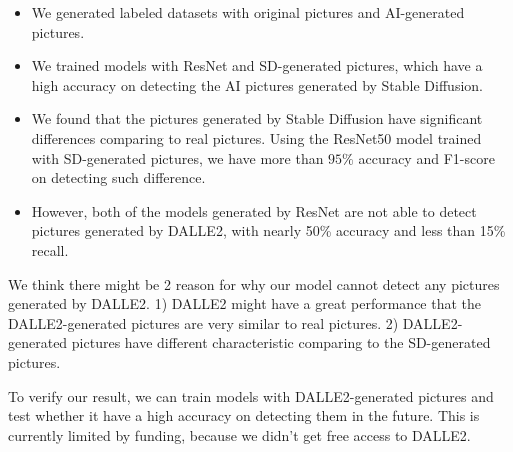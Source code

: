 \documentclass[11pt]{article}
\begin{document}
\begin{itemize}
  \item We generated labeled datasets with original pictures and AI-generated pictures.
  \item We trained models with ResNet and SD-generated pictures, which have a high accuracy on detecting the AI pictures generated by Stable Diffusion.
  \item We found that the pictures generated by Stable Diffusion have significant differences comparing to real pictures. Using the ResNet50 model trained with SD-generated pictures, we have more than $95\%$ accuracy and F1-score on detecting such difference.
  \item However, both of the models generated by ResNet are not able to detect pictures generated by DALLE2, with nearly 50\% accuracy and less than 15\% recall.
\end{itemize}

We think there might be 2 reason for why our model cannot detect any pictures generated by DALLE2. 1) DALLE2 might have a great performance that the DALLE2-generated pictures are very similar to real pictures. 2) DALLE2-generated pictures have different characteristic comparing to the SD-generated pictures.

To verify our result, we can train models with DALLE2-generated pictures and test whether it have a high accuracy on detecting them in the future. This is currently limited by funding, because we didn't get free access to DALLE2.



\end{document}
